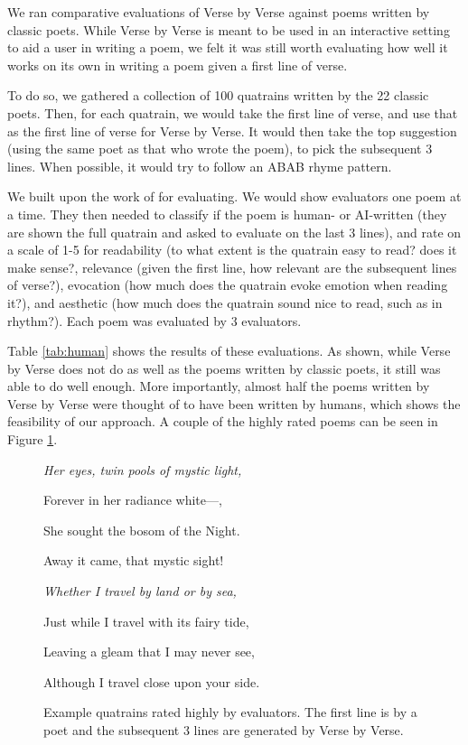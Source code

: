 \documentclass[11pt]{article}
\begin{document}
We ran comparative evaluations of Verse by Verse against poems written by classic poets.
While Verse by Verse is meant to be used in an interactive setting to aid a user in writing a poem, we felt it was still worth evaluating how well it works on its own in writing a poem given a first line of verse.

To do so, we gathered a collection of 100 quatrains written by the 22 classic poets.
Then, for each quatrain, we would take the first line of verse, and use that as the first line of verse for Verse by Verse.
It would then take the top suggestion (using the same poet as that who wrote the poem), to pick the subsequent 3 lines.
When possible, it would try to follow an ABAB rhyme pattern.

We built upon the work of \citet{hopkins2017} for evaluating.
We would show evaluators one poem at a time.
They then needed to classify if the poem is human- or AI-written (they are shown the full quatrain and asked to evaluate on the last 3 lines), and rate on a scale of 1-5 for readability (to what extent is the quatrain easy to read? does it make sense?, relevance (given the first line, how relevant are the subsequent lines of verse?), evocation (how much does the quatrain evoke emotion when reading it?), and aesthetic (how much does the quatrain sound nice to read, such as in rhythm?).
Each poem was evaluated by 3 evaluators.

Table \ref{tab:human} shows the results of these evaluations.
As shown, while Verse by Verse does not do as well as the poems written by classic poets, it still was able to do well enough.
More importantly, almost half the poems written by Verse by Verse were thought of to have been written by humans, which shows the feasibility of our approach.
A couple of the highly rated poems can be seen in Figure \ref{fig:examples}.


\begin{figure}
    \centering
    \textit{Her eyes, twin pools of mystic light,}
    
    Forever in her radiance white—,
    
    She sought the bosom of the Night.
    
    Away it came, that mystic sight!
    
    \vspace{5mm}
    
    \textit{Whether I travel by land or by sea,}
    
    Just while I travel with its fairy tide,
    
    Leaving a gleam that I may never see,
    
    Although I travel close upon your side.
    \caption{Example quatrains rated highly by evaluators. The first line is by a poet and the subsequent 3 lines are generated by Verse by Verse.}
    \label{fig:examples}
\end{figure}
\end{document}
